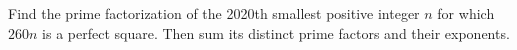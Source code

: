 Find the prime factorization of the 2020th smallest positive integer $n$ for which $260n$ is a perfect square. Then sum its distinct prime factors and their exponents.
